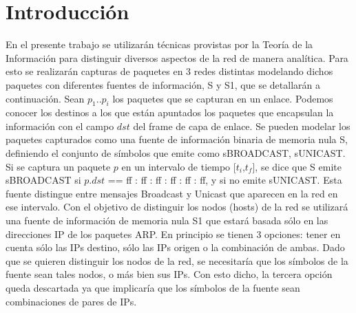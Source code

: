\section{Introducción}
En el presente trabajo se utilizarán técnicas provistas por la Teoría de la Información para distinguir diversos aspectos de la red de manera analítica. Para esto se realizarán capturas de paquetes en 3 redes distintas modelando dichos paquetes con diferentes fuentes de información, S y S1, que se detallarán a continuación.
Sean $p_1..p_i$ los paquetes que se capturan en un enlace. Podemos conocer los destinos a los que están apuntados los paquetes que encapsulan la información con el campo $dst$ del frame de capa de enlace. Se pueden modelar los paquetes capturados como una fuente de información binaria de memoria nula S, definiendo el conjunto de símbolos que emite como {sBROADCAST, sUNICAST}. Si se captura un paquete $p$ en un intervalo de tiempo [$t_i$,$t_f$], se dice que S emite sBROADCAST si $p.dst$ == ff : ff : ff : ff : ff : ff, y si no emite sUNICAST. Esta fuente distingue entre mensajes Broadcast y Unicast que aparecen en la red en ese intervalo. 
Con el objetivo de distinguir los nodos (hosts) de la red se utilizará una fuente de información de memoria nula S1 que estará basada sólo en las direcciones IP de los paquetes ARP. En principio se tienen 3 opciones: tener en cuenta sólo las IPs destino, sólo las IPs origen o la combinación de ambas. Dado que se quieren distinguir los nodos de la red, se necesitaría que los símbolos de la fuente sean tales nodos, o más bien sus IPs. Con esto dicho, la tercera opción queda descartada ya que implicaría que los símbolos de la fuente sean combinaciones de pares de IPs.